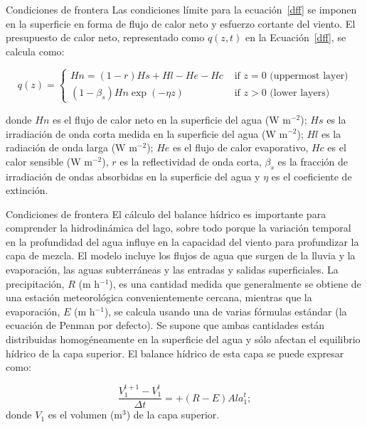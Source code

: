 \documentclass[
10pt,
aspectratio=169,
]{beamer}
\begin{document}
\begin{frame}{Condiciones de frontera}
Las condiciones límite para la ecuación~\ref{dff} se imponen en la superficie en forma de flujo de calor neto y esfuerzo cortante del viento. El presupuesto de calor neto, representado como $q(z,t)$ en la Ecuación~\ref{dff}, se calcula como:

\begin{equation}
q(z) = \left\{ \begin{array}{rl}
 Hn = (1-r)Hs + Hl - He - Hc &\mbox{ if $z = 0$ (uppermost layer)} \\
 (1-\beta_s)Hn \exp(-\eta z) &\mbox{ if $z > 0$ (lower layers)} 
\end{array} \right.
\label{qz}
\end{equation}

donde $Hn$ es el flujo de calor neto en la superficie del agua (W m$^{-2}$); $Hs$ es la irradiación de onda corta medida en la superficie del agua (W m$^{-2}$); $Hl$ es la radiación de onda larga (W m$^{-2}$); $He$ es el flujo de calor evaporativo, $Hc$ es el calor sensible (W m$^{-2}$), $r$ es la reflectividad de onda corta, $\beta_{s}$ es la fracción de irradiación de ondas absorbidas en la superficie del agua y $\eta$ es el coeficiente de extinción. 
\end{frame}


\begin{frame}{Condiciones de frontera}
El cálculo del balance hídrico es importante para comprender la hidrodinámica del lago, sobre todo porque la variación temporal en la profundidad del agua influye en la capacidad del viento para profundizar la capa de mezcla. El modelo incluye los flujos de agua que surgen de la lluvia y la evaporación, las aguas subterráneas y las entradas y salidas superficiales. La precipitación, $R$ (m h$^{-1}$), es una cantidad medida que generalmente se obtiene de una estación meteorológica convenientemente cercana, mientras que la evaporación, $E$ (m h$^{-1}$), se calcula usando una de varias fórmulas estándar (la ecuación de Penman por defecto). Se supone que ambas cantidades están distribuidas homogéneamente en la superficie del agua y sólo afectan el equilibrio hídrico de la capa superior. El balance hídrico de esta capa se puede expresar como:

\begin{equation}
\frac{V_{1}^{t+1}-V_1^t}{\Delta t} =  + (R - E) Ala_1^t ;
 \label{rainEva}
\end{equation}
donde $V_1$ es el volumen (m$^3$) de la capa superior.

\end{frame}
\end{document}
